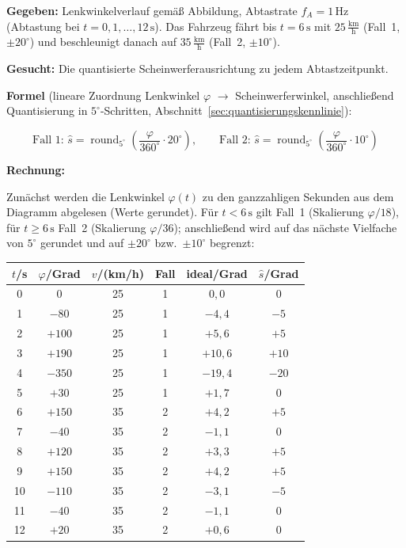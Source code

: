 \begin{beispiel}

\textbf{Gegeben:} Lenkwinkelverlauf gemäß Abbildung, Abtastrate $f_A = 1\,\text{Hz}$
(Abtastung bei $t = 0, 1, \ldots, 12\,\text{s}$). Das Fahrzeug fährt bis
$t = 6\,\text{s}$ mit $25\,\tfrac{\text{km}}{\text{h}}$ (Fall~1, $\pm 20^\circ$)
und beschleunigt danach auf $35\,\tfrac{\text{km}}{\text{h}}$ (Fall~2,
$\pm 10^\circ$).

\textbf{Gesucht:} Die quantisierte Scheinwerferausrichtung zu jedem
Abtastzeitpunkt.

\textbf{Formel} (lineare Zuordnung Lenkwinkel $\varphi$ $\to$ Scheinwerferwinkel,
anschließend Quantisierung in $5^\circ$-Schritten,
Abschnitt~\ref{sec:quantisierungskennlinie}):

$$
\text{Fall 1: } \hat{s} = \operatorname{round}_{5^\circ}\!\left(\frac{\varphi}{360^\circ}\cdot 20^\circ\right),
\qquad
\text{Fall 2: } \hat{s} = \operatorname{round}_{5^\circ}\!\left(\frac{\varphi}{360^\circ}\cdot 10^\circ\right)
$$

\textbf{Rechnung:}

Zunächst werden die Lenkwinkel $\varphi(t)$ zu den ganzzahligen Sekunden aus dem
Diagramm abgelesen (Werte gerundet). Für $t < 6\,\text{s}$ gilt Fall~1
(Skalierung $\varphi/18$), für $t \geq 6\,\text{s}$ Fall~2 (Skalierung
$\varphi/36$); anschließend wird auf das nächste Vielfache von $5^\circ$
gerundet und auf $\pm 20^\circ$ bzw.\ $\pm 10^\circ$ begrenzt:

\begin{center}
\begin{tabular}{c|c|c|c|c|c}
\toprule
$t$/s & $\varphi$/Grad & $v$/(km/h) & Fall & ideal/Grad & $\hat{s}$/Grad \\
\midrule
0  & $0$    & 25 & 1 & $0{,}0$   & $0$   \\
1  & $-80$  & 25 & 1 & $-4{,}4$  & $-5$  \\
2  & $+100$ & 25 & 1 & $+5{,}6$  & $+5$  \\
3  & $+190$ & 25 & 1 & $+10{,}6$ & $+10$ \\
4  & $-350$ & 25 & 1 & $-19{,}4$ & $-20$ \\
5  & $+30$  & 25 & 1 & $+1{,}7$  & $0$   \\
\midrule
6  & $+150$ & 35 & 2 & $+4{,}2$  & $+5$  \\
7  & $-40$  & 35 & 2 & $-1{,}1$  & $0$   \\
8  & $+120$ & 35 & 2 & $+3{,}3$  & $+5$  \\
9  & $+150$ & 35 & 2 & $+4{,}2$  & $+5$  \\
10 & $-110$ & 35 & 2 & $-3{,}1$  & $-5$  \\
11 & $-40$  & 35 & 2 & $-1{,}1$  & $0$   \\
12 & $+20$  & 35 & 2 & $+0{,}6$  & $0$   \\
\bottomrule
\end{tabular}
\end{center}


\end{beispiel}
